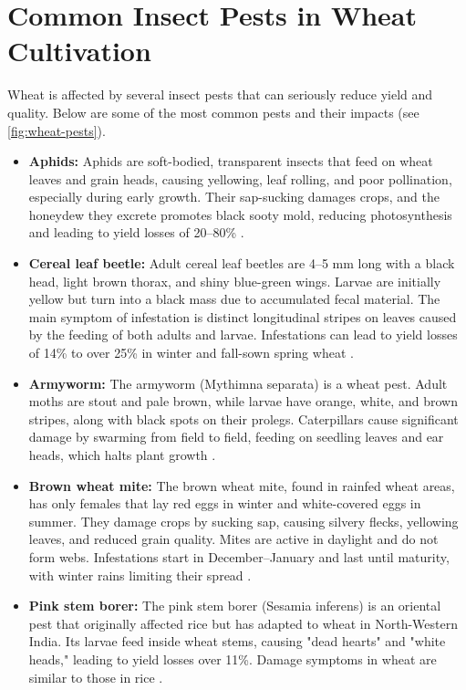 \section{Common Insect Pests in Wheat Cultivation}
Wheat is affected by several insect pests that can seriously reduce yield and quality. Below are some of the most common pests and their impacts (see \autoref{fig:wheat-pests}).
\begin{itemize}
    \item \textbf{Aphids:} Aphids are soft-bodied, transparent insects that feed on wheat leaves and grain heads, causing yellowing, leaf rolling, and poor pollination, especially during early growth. Their sap-sucking damages crops, and the honeydew they excrete promotes black sooty mold, reducing photosynthesis and leading to yield losses of 20–80\% \parencite{duveiller2012wheat,farook2019insect}.

    \item \textbf{Cereal leaf beetle:} Adult cereal leaf beetles are 4–5 mm long with a black head, light brown thorax, and shiny blue-green wings. Larvae are initially yellow but turn into a black mass due to accumulated fecal material. The main symptom of infestation is distinct longitudinal stripes on leaves caused by the feeding of both adults and larvae. Infestations can lead to yield losses of 14\% to over 25\% in winter and fall-sown spring wheat \parencite{duveiller2012wheat}.

    \item \textbf{Armyworm:} The armyworm (Mythimna separata) is a wheat pest. Adult moths are stout and pale brown, while larvae have orange, white, and brown stripes, along with black spots on their prolegs. Caterpillars cause significant damage by swarming from field to field, feeding on seedling leaves and ear heads, which halts plant growth \parencite{farook2019insect}.

    \item \textbf{Brown wheat mite:} The brown wheat mite, found in rainfed wheat areas, has only females that lay red eggs in winter and white-covered eggs in summer. They damage crops by sucking sap, causing silvery flecks, yellowing leaves, and reduced grain quality. Mites are active in daylight and do not form webs. Infestations start in December–January and last until maturity, with winter rains limiting their spread \parencite{kashyap2018identification}.

    \item \textbf{Pink stem borer:} The pink stem borer (Sesamia inferens) is an oriental pest that originally affected rice but has adapted to wheat in North-Western India. Its larvae feed inside wheat stems, causing "dead hearts" and "white heads," leading to yield losses over 11\%. Damage symptoms in wheat are similar to those in rice \parencite{farook2019insect}.


\end{itemize}

